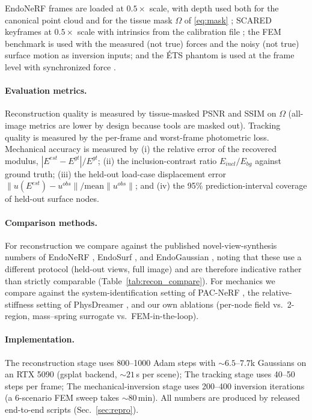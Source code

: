 \documentclass[review]{elsarticle}
\begin{document}
EndoNeRF frames are loaded at $0.5\times$ scale, with depth used both for
the canonical point cloud and for the tissue mask $\Omega$ of
\eqref{eq:mask} \citep{endonerf}; SCARED keyframes at $0.5\times$ scale with intrinsics from
the calibration file \citep{scared}; the FEM benchmark is used with the measured (not
true) forces and the noisy (not true) surface motion as inversion inputs;
and the \'ETS phantom is used at the frame level with synchronized force \citep{etsphantom}.

\paragraph{Evaluation metrics.}
Reconstruction quality is measured by tissue-masked PSNR and SSIM on
$\Omega$ (all-image metrics are lower by design because tools are masked
out). Tracking quality is measured by the per-frame and worst-frame
photometric loss. Mechanical accuracy is measured by (i) the relative error
of the recovered modulus, $|E^{est} - E^{gt}| / E^{gt}$; (ii) the
inclusion-contrast ratio $E_{incl}/E_{bg}$ against ground truth; (iii) the
held-out load-case displacement error
$\|u(E^{est}) - u^{obs}\| / \mathrm{mean}\|u^{obs}\|$; and (iv) the 95\%
prediction-interval coverage of held-out surface nodes.

\paragraph{Comparison methods.}
For reconstruction we compare against the published novel-view-synthesis
numbers of EndoNeRF \citep{endonerf}, EndoSurf \citep{endosurf}, and
EndoGaussian \citep{endogaussian}, noting that these use a different
protocol (held-out views, full image) and are therefore indicative rather
than strictly comparable (Table~\ref{tab:recon_compare}). For mechanics we
compare against the system-identification setting of PAC-NeRF
\citep{pacnerf}, the relative-stiffness setting of PhysDreamer
\citep{physdreamer}, and our own ablations (per-node field vs.\ 2-region,
mass--spring surrogate vs.\ FEM-in-the-loop).

\paragraph{Implementation.}
The reconstruction stage uses 800--1000 Adam steps with ${\sim}6.5$--$7.7$k Gaussians on an
RTX 5090 (gsplat backend, ${\sim}21$\,s per scene); The tracking stage uses 40--50
steps per frame; The mechanical-inversion stage uses 200--400 inversion iterations (a 6-scenario
FEM sweep takes ${\sim}80$\,min). All numbers are produced by released
end-to-end scripts (Sec.~\ref{sec:repro}).
\end{document}
